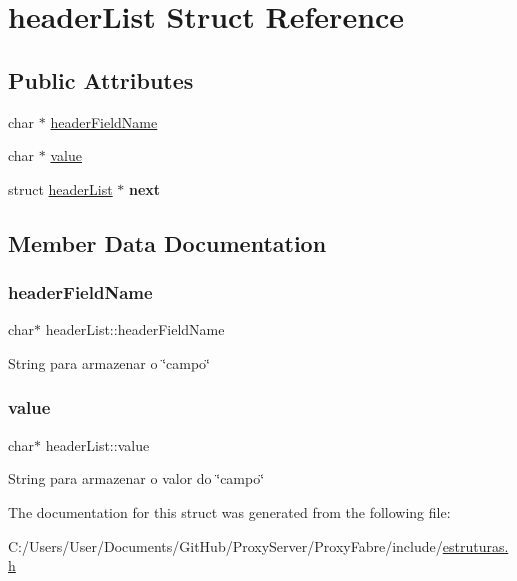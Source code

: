 \hypertarget{structheader_list}{}\section{header\+List Struct Reference}
\label{structheader_list}
\subsection*{Public Attributes}
\begin{DoxyCompactItemize}
\item 
char $\ast$ \hyperlink{structheader_list_a9609395925ead158f9ecef390f921d82}{header\+Field\+Name}
\item 
char $\ast$ \hyperlink{structheader_list_a667e6e52c31dcd07d4f42077303be7a0}{value}
\item 
\mbox{\label{structheader_list_a66bcc26747839d7a1c8d2cb7055a0f6a}} 
struct \hyperlink{structheader_list}{header\+List} $\ast$ {\bfseries next}
\end{DoxyCompactItemize}


\subsection{Member Data Documentation}
\mbox{\label{structheader_list_a9609395925ead158f9ecef390f921d82}} 
\subsubsection{\texorpdfstring{header\+Field\+Name}{headerFieldName}}
{\footnotesize\ttfamily char$\ast$ header\+List\+::header\+Field\+Name}

String para armazenar o \char`\"{}campo\char`\"{} \mbox{\label{structheader_list_a667e6e52c31dcd07d4f42077303be7a0}} 
\subsubsection{\texorpdfstring{value}{value}}
{\footnotesize\ttfamily char$\ast$ header\+List\+::value}

String para armazenar o valor do \char`\"{}campo\char`\"{} 

The documentation for this struct was generated from the following file\+:\begin{DoxyCompactItemize}
\item 
C\+:/\+Users/\+User/\+Documents/\+Git\+Hub/\+Proxy\+Server/\+Proxy\+Fabre/include/\hyperlink{estruturas_8h}{estruturas.\+h}\end{DoxyCompactItemize}
